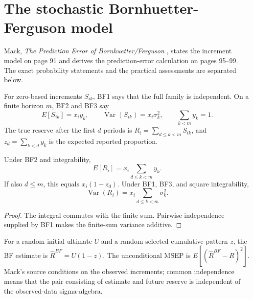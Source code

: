 \chapter{The stochastic Bornhuetter-Ferguson model}

Mack, \emph{The Prediction Error of Bornhuetter/Ferguson} \cite{Mack2008BF}, states the
increment model on page 91 and derives the prediction-error calculation on
pages 95--99. The exact probability statements and the practical assessments
are separated below.

\begin{definition}\label{def:bfModel}\leanok
For zero-based increments $S_{ik}$, BF1 says that the full family is
independent. On a finite horizon $m$, BF2 and BF3 say
\[
 E[S_{ik}]=x_i y_k,\qquad \operatorname{Var}(S_{ik})=x_i\sigma_k^2,
 \qquad \sum_{k<m}y_k=1.
\]
The true reserve after the first $d$ periods is
$R_i=\sum_{d\leq k<m}S_{ik}$, and
$z_d=\sum_{k<d}y_k$ is the expected reported proportion.
\end{definition}

\begin{theorem}\label{thm:bfModelMoments}\leanok
{}
Under BF2 and integrability,
\[
 E[R_i]=x_i\sum_{d\leq k<m}y_k.
\]
If also $d\leq m$, this equals $x_i(1-z_d)$.
Under BF1, BF3, and square integrability,
\[
 \operatorname{Var}(R_i)=x_i\sum_{d\leq k<m}\sigma_k^2.
\]
\end{theorem}
\begin{proof}\leanok The integral commutes with the finite sum. Pairwise
independence supplied by BF1 makes the finite-sum variance additive. \end{proof}

\begin{definition}\label{def:bfRandomEstimate}\leanok
For a random initial ultimate $U$ and a random selected cumulative pattern $z$,
the BF estimate is $\widehat R^{BF}=U(1-z)$. The unconditional MSEP is
$E[(\widehat R^{BF}-R)^2]$. Mack's source conditions on the observed increments;
common independence means that the pair consisting of estimate and future
reserve is independent of the observed-data sigma-algebra.
\end{definition}

